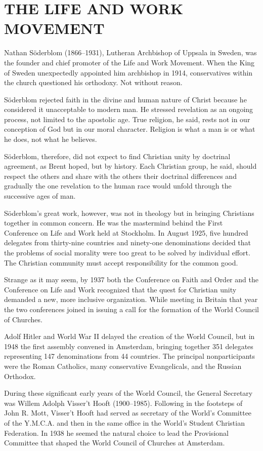 \section{THE LIFE AND WORK MOVEMENT}

Nathan Söderblom (1866–1931), Lutheran Archbishop of Uppsala in Sweden, was the founder and chief
promoter of the Life and Work Movement. When the King of Sweden unexpectedly appointed him
archbishop in 1914, conservatives within the church questioned his orthodoxy. Not without reason.

Söderblom rejected faith in the divine and human nature of Christ because he considered it
unacceptable to modern man. He stressed revelation as an ongoing process, not limited to the
apostolic age. True religion, he said, rests not in our conception of God but in our moral
character. Religion is what a man is or what he does, not what he believes.

Söderblom, therefore, did not expect to find Christian unity by doctrinal agreement, as Brent hoped,
but by history. Each Christian group, he said, should respect the others and share with the others
their doctrinal differences and gradually the one revelation to the human race would unfold through
the successive ages of man.

Söderblom’s great work, however, was not in theology but in bringing Christians together in common
concern. He was the mastermind behind the First Conference on Life and Work held at Stockholm. In
August 1925, five hundred delegates from thirty-nine countries and ninety-one denominations decided
that the problems of social morality were too great to be solved by individual effort. The Christian
community must accept responsibility for the common good.

Strange as it may seem, by 1937 both the Conference on Faith and Order and the Conference on Life
and Work recognized that the quest for Christian unity demanded a new, more inclusive organization.
While meeting in Britain that year the two conferences joined in issuing a call for the formation of
the World Council of Churches.

Adolf Hitler and World War II delayed the creation of the World Council, but in 1948 the first
assembly convened in Amsterdam, bringing together 351 delegates representing 147 denominations from
44 countries. The principal nonparticipants were the Roman Catholics, many conservative
Evangelicals, and the Russian Orthodox.

During these significant early years of the World Council, the General Secretary was Willem Adolph
Visser’t Hooft (1900–1985). Following in the footsteps of John R. Mott, Visser’t Hooft had served as
secretary of the World’s Committee of the Y.M.C.A. and then in the same office in the World’s
Student Christian Federation. In 1938 he seemed the natural choice to lead the Provisional Committee
that shaped the World Council of Churches at Amsterdam.

